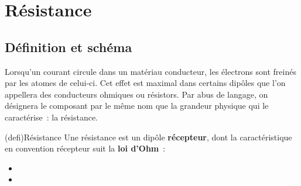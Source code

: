 \documentclass[../../main/main.tex]{subfiles}
\begin{document}
\section{Résistance}
\subsection{Définition et schéma}

Lorsqu'un courant circule dans un matériau conducteur, les électrons sont
freinés par les atomes de celui-ci. Cet effet est maximal dans certains dipôles
que l'on appellera des conducteurs ohmiques ou résistors. Par abus de langage,
on désignera le composant par le même nom que la grandeur physique qui le
caractérise~: la résistance.

\begin{tcb}[label=def:resistance, sidebyside](defi){Résistance}
	Une résistance est un dipôle \textbf{récepteur}, dont la caractéristique en
	convention récepteur suit la \textbf{loi d'Ohm}~:
	\psw{
		\[
			\boxed{U=RI}
			\Lra
			\boxed{GU=I}
		\]
	}
	\vspace{-15pt}
	\tcblower
	\begin{itemize}
		\item {}
		\item {}
	\end{itemize}
\end{tcb}
\end{document}
